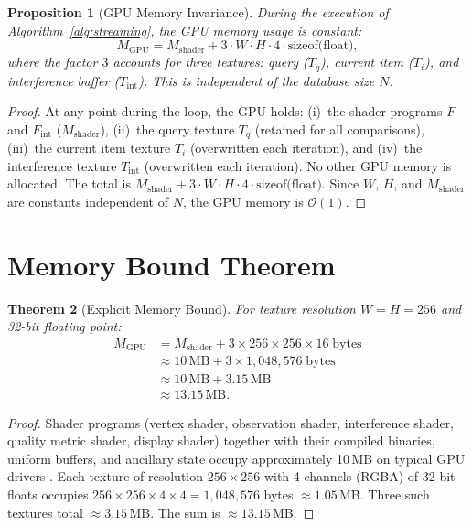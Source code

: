 \documentclass[11pt,twocolumn,a4paper]{article}
\newtheorem{theorem}{Theorem}[section]
\newtheorem{proposition}[theorem]{Proposition}
\newcommand{\BigO}{\mathcal{O}}
\newcommand{\Mgpu}{M_{\mathrm{GPU}}}
\newcommand{\Mshader}{M_{\mathrm{shader}}}
\begin{document}
\begin{proposition}[GPU Memory Invariance]
\label{prop:memory-invariance}
During the execution of Algorithm~\ref{alg:streaming}, the GPU
memory usage is constant:
\begin{equation}
\Mgpu = \Mshader + 3 \cdot W \cdot H \cdot 4 \cdot
  \text{sizeof(float)},
\label{eq:Mgpu}
\end{equation}
where the factor $3$ accounts for three textures: query ($T_q$),
current item ($T_i$), and interference buffer ($T_{\mathrm{int}}$).
This is independent of the database size $N$.
\end{proposition}

\begin{proof}
At any point during the loop, the GPU holds: (i)~the shader programs
$F$ and $F_{\mathrm{int}}$ ($\Mshader$), (ii)~the query texture $T_q$
(retained for all comparisons), (iii)~the current item texture $T_i$
(overwritten each iteration), and (iv)~the interference texture
$T_{\mathrm{int}}$ (overwritten each iteration). No other GPU memory
is allocated. The total is $\Mshader + 3 \cdot W \cdot H \cdot 4
\cdot \text{sizeof(float)}$. Since $W$, $H$, and $\Mshader$ are
constants independent of $N$, the GPU memory is $\BigO(1)$.
\end{proof}


\section{Memory Bound Theorem}
\label{sec:memory-bound}

\begin{theorem}[Explicit Memory Bound]
\label{thm:memory-bound}
For texture resolution $W = H = 256$ and 32-bit floating point:
\begin{align}
\Mgpu &= \Mshader + 3 \times 256 \times 256 \times 16
  \;\text{bytes} \nonumber\\
&\approx 10\,\text{MB} + 3 \times 1{,}048{,}576
  \;\text{bytes} \nonumber\\
&\approx 10\,\text{MB} + 3.15\,\text{MB} \nonumber\\
&\approx 13.15\,\text{MB}.
\label{eq:explicit-bound}
\end{align}
\end{theorem}

\begin{proof}
Shader programs (vertex shader, observation shader, interference
shader, quality metric shader, display shader) together with their
compiled binaries, uniform buffers, and ancillary state occupy
approximately 10\,MB on typical GPU drivers
\citep{khronosglsl,khronosvulkan}. Each texture of resolution
$256 \times 256$ with 4 channels (RGBA) of 32-bit floats occupies
$256 \times 256 \times 4 \times 4 = 1{,}048{,}576$ bytes
$\approx 1.05$\,MB. Three such textures total $\approx 3.15$\,MB.
The sum is $\approx 13.15$\,MB. \qedhere
\end{proof}
\end{document}
